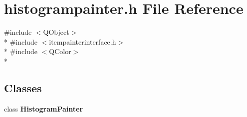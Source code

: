 \section{histogrampainter.\+h File Reference}
\label{curve_2painters_2histogrampainter_8h}
{\ttfamily \#include $<$Q\+Object$>$}\\*
{\ttfamily \#include $<$itempainterinterface.\+h$>$}\\*
{\ttfamily \#include $<$Q\+Color$>$}\\*
\subsection*{Classes}
\begin{DoxyCompactItemize}
\item 
class {\bf Histogram\+Painter}
\end{DoxyCompactItemize}
